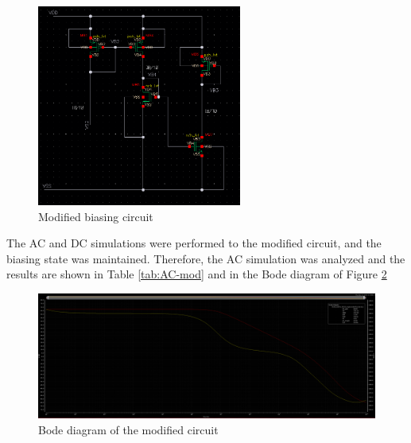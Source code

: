 \begin{figure}[H]
    \centering
    \includegraphics[width=0.6\textwidth]{Images/v3_bias.png}
    \caption{Modified biasing circuit}
    \label{fig:mod-bias}
\end{figure}

The AC and DC simulations were performed to the modified circuit, and the biasing state was maintained. Therefore, the AC simulation was analyzed and the results are shown in Table \ref{tab:AC-mod} and in the Bode diagram of Figure \ref{fig:bod-mod}

\begin{figure}[H]
    \centering
    \includegraphics[width=1\textwidth]{Images/v3_bode.png}
    \caption{Bode diagram of the modified circuit}
    \label{fig:bod-mod}
\end{figure}

